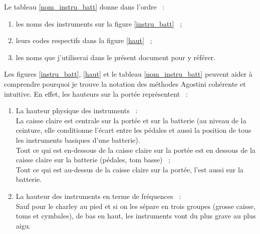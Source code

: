 Le tableau \ref{nom_instru_batt} donne dans l’ordre~ :
\begin{enumerate}
    \item les noms des instruments sur la figure \ref{instru_batt}~ ;
    \item leurs codes respectifs dans la figure \ref{haut}~ ;
    \item les noms que j’utiliserai dans le présent document pour y référer.
\end{enumerate}
Les figures \ref{instru_batt}, \ref{haut} et le tableau \ref{nom_instru_batt}
peuvent aider à comprendre pourquoi je trouve la notation des méthodes Agostini
cohérente et intuitive. En effet, les hauteurs sur la portée représentent~ :
\begin{enumerate}
	\item La hauteur physique des instruments~ :\\
	La caisse claire est centrale sur la portée et sur la batterie (au niveau
    de la ceinture, elle conditionne l’écart entre les pédales et aussi la
    position de tous les instruments basiques d’une batterie).\\
	Tout ce qui est en-dessous de la caisse claire sur la portée est en dessous de
    la caisse claire sur la batterie (pédales, tom basse)~ ;\\
	Tout ce qui est au-dessus de la caisse claire sur la portée, l’est aussi
    sur la batterie.\\
	\item La hauteur des instruments en terme de fréquences~ :\\
	Sauf pour le charley au pied et si on les sépare en trois groupes
    (grosse caisse, toms et cymbales), de bas en haut, les instruments vont du
    plus grave au plus aigu.
\end{enumerate}

